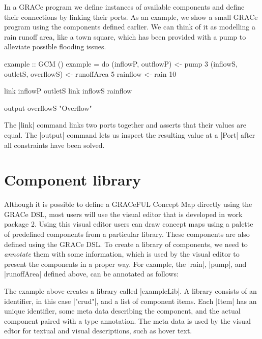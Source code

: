 \documentclass[a4paper]{article}
\begin{document}
In a GRACe program we define instances of available components and define their
connections by linking their ports. As an example, we show a small GRACe program
using the components defined earlier. We can think of it as modelling a rain
runoff area, like a town square, which has been provided with a pump to
alleviate possible flooding issues.
\begin{haskellcode}
example :: GCM ()
example = do
  (inflowP, outflowP) <- pump 3
  (inflowS, outletS, overflowS) <- runoffArea 5
  rainflow <- rain 10

  link inflowP outletS
  link inflowS rainflow

  output overflowS "Overflow"
\end{haskellcode}
The |link| command links two ports together and asserts that their values are
equal. The |output| command lets us inspect the resulting value at a |Port|
after all constraints have been solved.


\section{Component library}

Although it is possible to define a GRACeFUL Concept Map directly using the
GRACe DSL, most users will use the visual editor that is developed in work
package 2. Using this visual editor users can draw concept maps using a palette
of predefined components from a particular library. These components are also
defined using the GRACe DSL. To create a library of components, we need to
\emph{annotate} them with some information, which is used by the visual editor
to present the components in a proper way. For example, the |rain|, |pump|, and
|runoffArea| defined above, can be annotated as follows:
The example above creates a library called |exampleLib|. A library consists of
an identifier, in this case |"crud"|, and a list of component items. Each |Item|
has an unique identifier, some meta data describing the component, and the
actual component paired with a type annotation. The meta data is used by the
visual edtor for textual and visual descriptions, such as hover text.
\end{document}
